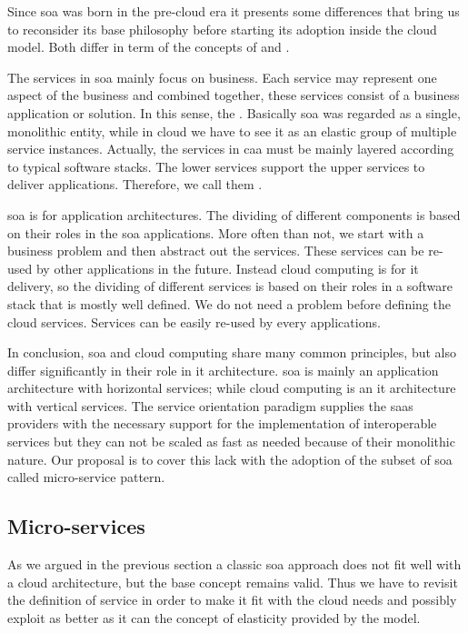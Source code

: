 Since \ac{soa} was born in the pre-cloud era it presents some differences that bring us to reconsider its
base philosophy before starting its adoption inside the cloud model. Both differ in term of the concepts
of  and .

The services in \ac{soa} mainly focus on business. Each service may represent one aspect of the business and
combined together, these services consist of a business application or solution. In this sense, the
. Basically \ac{soa} was regarded as a single, monolithic entity,
while in cloud we have to see it as an elastic group of  multiple service instances. Actually, the services
in \ac{caa} must be mainly layered according to typical software stacks. The lower services support the upper
services to deliver applications. Therefore, we call them .

\ac{soa} is for application architectures. The dividing of different components is based on their roles in
the \ac{soa} applications. More often than not, we start with a business problem and then abstract out the
services. These services can be re-used by other applications in the future. Instead cloud computing is for
\acs{it} delivery, so the dividing of different services is based on their roles in a software stack that is
mostly well defined. We do not need a problem before defining the cloud services. Services can be easily
re-used by every applications.

In conclusion, \ac{soa} and cloud computing share many common principles, but also differ significantly
in their role in \acs{it} architecture. \ac{soa} is mainly an application architecture with horizontal
services; while cloud computing is an \acs{it} architecture with vertical services. The service orientation
paradigm supplies the \ac{saas} providers with the necessary support for the implementation of interoperable 
services but they can not be scaled as fast as needed because of their monolithic nature. Our proposal is
to cover this lack with the adoption of the subset of \ac{soa} called micro-service pattern.

\subsection{Micro-services}
\label{sec:architecture-soaRevisitation-microService}
As we argued in the previous section a classic \ac{soa} approach does not fit well with a cloud
architecture, but the base concept remains valid. Thus we have to revisit the definition of
service in order to make it fit with the cloud needs and possibly exploit as better as it can the
concept of elasticity provided by the model.

